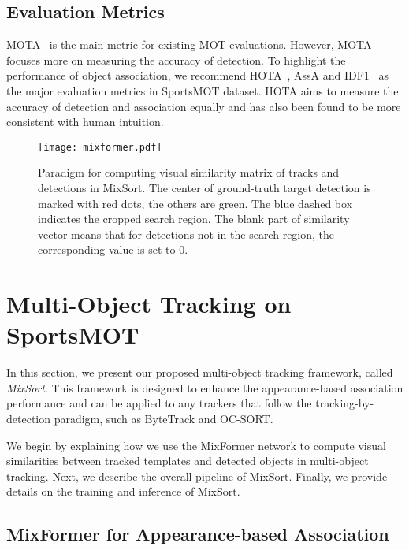 \documentclass[10pt,twocolumn,letterpaper]{article}
\begin{document}
\subsection{Evaluation Metrics}

MOTA~\cite{bernardin2008evaluating} is the main metric for existing MOT evaluations. However, MOTA focuses more on measuring the accuracy of detection. 
To highlight the performance of object association, we recommend HOTA~\cite{luiten2021hota}, AssA and IDF1~\cite{ristani2016performance} as the major evaluation metrics in SportsMOT dataset.
HOTA aims to measure the accuracy of detection and association equally and has also been found to be more consistent with human intuition.

\begin{figure}[pt]
\centering
\texttt{[image: mixformer.pdf]}
\vspace{-7mm}
\caption{Paradigm for computing visual similarity matrix of tracks and detections in MixSort. The center of ground-truth target detection is marked with red dots, the others are green. The blue dashed box indicates the cropped search region. The blank part of similarity vector means that for detections not in the search region, the corresponding value is set to 0.}
\vspace{-4mm}
\label{fig:2}
\end{figure}

\section{Multi-Object Tracking on SportsMOT}
In this section, we present our proposed multi-object tracking framework, called \textit{MixSort}. This framework is designed to enhance the appearance-based association performance and can be applied to any trackers that follow the tracking-by-detection paradigm, such as ByteTrack\cite{zhang2022bytetrack} and OC-SORT\cite{cao2022observation}.

We begin by explaining how we use the MixFormer\cite{cui2022mixformer} network to compute visual similarities between tracked templates and detected objects in multi-object tracking. Next, we describe the overall pipeline of MixSort. Finally, we provide details on the training and inference of MixSort.

\subsection{MixFormer for Appearance-based Association}
\end{document}
